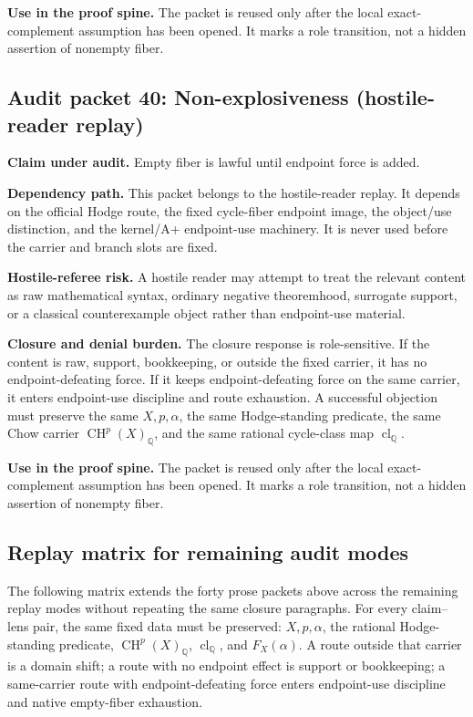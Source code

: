 \documentclass[11pt]{article}
\newcommand{\QQ}{\mathbb{Q}}
\newcommand{\CH}{\operatorname{CH}}
\newcommand{\clQ}{\operatorname{cl}_{\QQ}}
\begin{document}
\par\noindent\textbf{Use in the proof spine.} The packet is reused only after the local exact-complement assumption has been opened. It marks a role transition, not a hidden assertion of nonempty fiber.


\subsection{Audit packet 40: Non-explosiveness (hostile-reader replay)}


\par\noindent\textbf{Claim under audit.} Empty fiber is lawful until endpoint force is added.


\par\noindent\textbf{Dependency path.} This packet belongs to the hostile-reader replay. It depends on the official Hodge route, the fixed cycle-fiber endpoint image, the object/use distinction, and the kernel/A+ endpoint-use machinery. It is never used before the carrier and branch slots are fixed.


\par\noindent\textbf{Hostile-referee risk.} A hostile reader may attempt to treat the relevant content as raw mathematical syntax, ordinary negative theoremhood, surrogate support, or a classical counterexample object rather than endpoint-use material.


\par\noindent\textbf{Closure and denial burden.} The closure response is role-sensitive. If the content is raw, support, bookkeeping, or outside the fixed carrier, it has no endpoint-defeating force. If it keeps endpoint-defeating force on the same carrier, it enters endpoint-use discipline and route exhaustion. A successful objection must preserve the same $X,p,\alpha$, the same Hodge-standing predicate, the same Chow carrier $\CH^p(X)_\QQ$, and the same rational cycle-class map $\clQ$.


\par\noindent\textbf{Use in the proof spine.} The packet is reused only after the local exact-complement assumption has been opened. It marks a role transition, not a hidden assertion of nonempty fiber.


\subsection{Replay matrix for remaining audit modes}

The following matrix extends the forty prose packets above across the remaining replay modes without repeating the same closure paragraphs. For every claim--lens pair, the same fixed data must be preserved: $X,p,\alpha$, the rational Hodge-standing predicate, $\CH^p(X)_\QQ$, $\clQ$, and $F_X(\alpha)$. A route outside that carrier is a domain shift; a route with no endpoint effect is support or bookkeeping; a same-carrier route with endpoint-defeating force enters endpoint-use discipline and native empty-fiber exhaustion.
\end{document}
